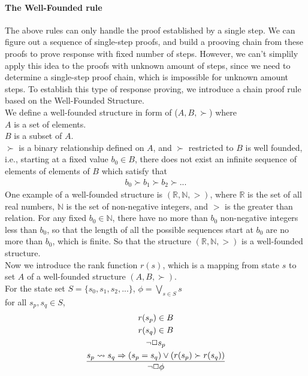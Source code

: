 \paragraph{The Well-Founded rule}
The above rules can only handle the proof established by a single step. We can figure out a sequence of single-step proofs, and build a prooving chain from these proofs to prove response with fixed number of steps. However, we can't simplily apply this idea to the proofs with unknown amount of steps, since we need to determine a single-step proof chain, which is impossible for unknown amount steps. To establish this type of response proving, we introduce a chain proof rule based on the Well-Founded Structure.\\
We define a well-founded structure in form of ($A,B,\succ$) where\\
$A$ is a set of elements.\\
$B$ is a subset of $A$.\\
$\succ$ is a binary relationship defined on $A$, and $\succ$ restricted to $B$ is well founded, i.e., starting at a fixed value $b_0\in{B}$, there does not exist an infinite sequence of elements of elements of $B$ which satisfy that
\begin{gather*}
  b_0\succ{b_1}\succ{b_2}\succ ...
\end{gather*}
One example of a well-founded structure is $(\mathbb{R},\mathbb{N}, >)$, where $\mathbb{R}$ is the set of all real numbers, $\mathbb{N}$ is the set of non-negative integers, and $>$ is the greater than relation. For any fixed $b_0\in\mathbb{N}$, there have no more than $b_0$ non-negative integers less than $b_0$, so that the length of all the possible sequences start at $b_0$ are no more than $b_0$, which is finite. So that the structure $(\mathbb{R},\mathbb{N}, >)$ is a well-founded structure.\\
Now we introduce the rank function $r(s)$, which is a mapping from state $s$ to set $A$ of a well-founded structure $(A, B, \succ)$.\\
For the state set $S = \{{s_0},{s_1},{s_2},...\}$, $\phi = \bigvee_{s\in{S}}^{} s$\\
for all ${s_{p}},{s_{q}}\in{S}$,  
\begin{gather*}
  r(s_{p})\in{B}\\
  r(s_{q})\in{B}\\
  \neg\Box{s_{p}}\\
  \frac{s_{p}\rightsquigarrow{s_{q}}\Rightarrow({s_{p}}={s_{q}})\vee({r({s_{p}})}\succ{r({s_{q}})})}{\neg\Box\phi}
\end{gather*}
